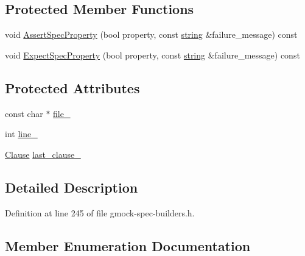 \subsection*{Protected Member Functions}
\begin{DoxyCompactItemize}
\item 
void \hyperlink{classtesting_1_1internal_1_1_untyped_on_call_spec_base_aa0eb811082c71f44a696a14f662b14b5}{Assert\+Spec\+Property} (bool property, const \hyperlink{namespacetesting_1_1internal_a8e8ff5b11e64078831112677156cb111}{string} \&failure\+\_\+message) const 
\item 
void \hyperlink{classtesting_1_1internal_1_1_untyped_on_call_spec_base_a9df045539c850fc4ba04d2ca02602335}{Expect\+Spec\+Property} (bool property, const \hyperlink{namespacetesting_1_1internal_a8e8ff5b11e64078831112677156cb111}{string} \&failure\+\_\+message) const 
\end{DoxyCompactItemize}
\subsection*{Protected Attributes}
\begin{DoxyCompactItemize}
\item 
const char $\ast$ \hyperlink{classtesting_1_1internal_1_1_untyped_on_call_spec_base_adf4e6c5022dfeb482f5328e9bb58ba88}{file\+\_\+}
\item 
int \hyperlink{classtesting_1_1internal_1_1_untyped_on_call_spec_base_a1dfa0dafaae6697f17adf5d837ca77c7}{line\+\_\+}
\item 
\hyperlink{classtesting_1_1internal_1_1_untyped_on_call_spec_base_a78ebf16bfee40375e33a983f3100f354}{Clause} \hyperlink{classtesting_1_1internal_1_1_untyped_on_call_spec_base_adb6d19adfeb5fde535d854aedbc5fb0f}{last\+\_\+clause\+\_\+}
\end{DoxyCompactItemize}


\subsection{Detailed Description}


Definition at line 245 of file gmock-\/spec-\/builders.\+h.



\subsection{Member Enumeration Documentation}
